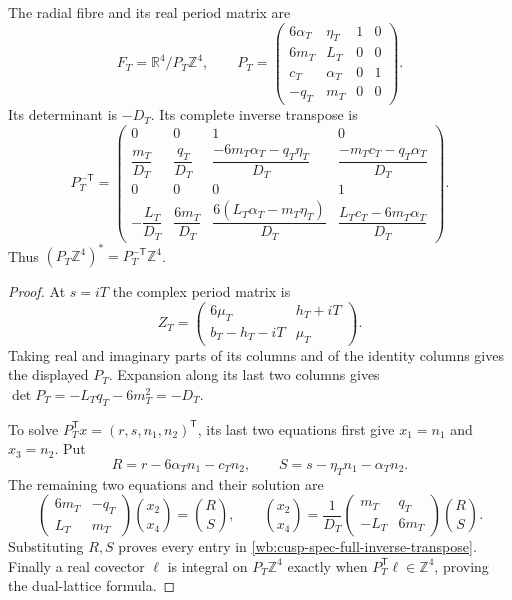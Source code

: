 \begin{proposition}
\label{mapsIII:carrier-real-periods}
The radial fibre and its real period matrix are
\[
 F_T=\mathbb R^4/P_T\mathbb Z^4,\qquad
 P_T=\begin{pmatrix}
 6\alpha_T&\eta_T&1&0\\
 6m_T&L_T&0&0\\
 c_T&\alpha_T&0&1\\
 -q_T&m_T&0&0
 \end{pmatrix}.
\]
Its determinant is $-D_T$.  Its complete inverse transpose is
\begin{equation}
 P_T^{-\mathsf T}=
 \begin{pmatrix}
 0&0&1&0\\[2pt]
 \dfrac{m_T}{D_T}&\dfrac{q_T}{D_T}&
 \dfrac{-6m_T\alpha_T-q_T\eta_T}{D_T}&
 \dfrac{-m_Tc_T-q_T\alpha_T}{D_T}\\[7pt]
 0&0&0&1\\[2pt]
 -\dfrac{L_T}{D_T}&\dfrac{6m_T}{D_T}&
 \dfrac{6(L_T\alpha_T-m_T\eta_T)}{D_T}&
 \dfrac{L_Tc_T-6m_T\alpha_T}{D_T}
 \end{pmatrix}.
 \label{wb:cusp-spec-full-inverse-transpose}
\end{equation}
Thus $(P_T\mathbb Z^4)^*=P_T^{-\mathsf T}\mathbb Z^4$.
\end{proposition}

\begin{proof}
At $s=iT$ the complex period matrix is
\[
 Z_T=\begin{pmatrix}6\mu_T&h_T+iT\\
                          b_T-h_T-iT&\mu_T\end{pmatrix}.
\]
Taking real and imaginary parts of its columns and of the identity
columns gives the displayed $P_T$.  Expansion along its last two
columns gives $\det P_T=-L_Tq_T-6m_T^2=-D_T$.

To solve $P_T^{\mathsf T}x=(r,s,n_1,n_2)^{\mathsf T}$, its last two
equations first give $x_1=n_1$ and $x_3=n_2$.  Put
\[
 R=r-6\alpha_Tn_1-c_Tn_2,\qquad
 S=s-\eta_Tn_1-\alpha_Tn_2.
\]
The remaining two equations and their solution are
\[
 \begin{pmatrix}6m_T&-q_T\\L_T&m_T\end{pmatrix}
 \binom{x_2}{x_4}=\binom R S,
 \qquad
 \binom{x_2}{x_4}=
 \frac1{D_T}\begin{pmatrix}m_T&q_T\\-L_T&6m_T\end{pmatrix}
 \binom R S.
\]
Substituting $R,S$ proves every entry in
\eqref{wb:cusp-spec-full-inverse-transpose}.  Finally a real covector
$\ell$ is integral on $P_T\mathbb Z^4$ exactly when
$P_T^{\mathsf T}\ell\in\mathbb Z^4$, proving the dual-lattice formula.
\end{proof}

